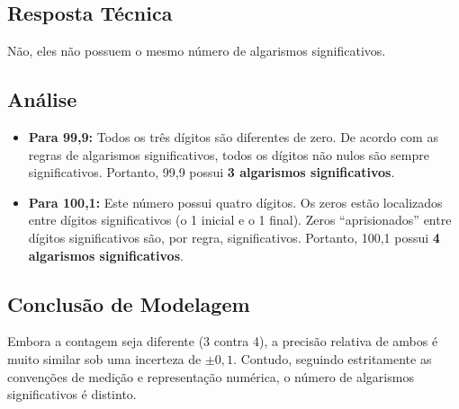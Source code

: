 \subsection*{Resposta Técnica}
Não, eles não possuem o mesmo número de algarismos significativos.

\subsection*{Análise}
\begin{itemize}
    \item \textbf{Para 99,9:} Todos os três dígitos são diferentes de zero. De acordo com as regras de algarismos significativos, todos os dígitos não nulos são sempre significativos. Portanto, 99,9 possui \textbf{3 algarismos significativos}.

    \item \textbf{Para 100,1:} Este número possui quatro dígitos. Os zeros estão localizados entre dígitos significativos (o 1 inicial e o 1 final). Zeros ``aprisionados'' entre dígitos significativos são, por regra, significativos. Portanto, 100,1 possui \textbf{4 algarismos significativos}.
\end{itemize}

\subsection*{Conclusão de Modelagem}
Embora a contagem seja diferente (3 contra 4), a precisão relativa de ambos é muito similar sob uma incerteza de $\pm 0{,}1$. Contudo, seguindo estritamente as convenções de medição e representação numérica, o número de algarismos significativos é distinto.